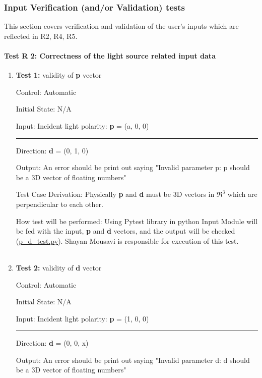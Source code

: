 \documentclass[12pt, titlepage]{article}
\begin{document}
\subsubsection{Input Verification (and/or Validation) tests}


This section covers verification and validation of the user's inputs which are reflected in R2, R4, R5.
		
\paragraph{Test R 2: Correctness of the light source related input data}
\begin{enumerate}		

\item{\textbf{Test 1:} validity of \textbf{p} vector\\}

Control: Automatic
					
Initial State: N/A
					
Input: Incident light polarity: \textbf{p} = (a, 0, 0)\\
\rule{1.15cm}{0pt} Direction: \textbf{d} = (0, 1, 0)
					
Output: An error should be print out saying "Invalid parameter p: p should be a 3D vector of floating numbers"  

Test Case Derivation: Physically \textbf{p} and \textbf{d} must be 3D vectors in $\Re^3$ which are perpendicular to each other.
 				
How test will be performed: Using Pytest library in python Input Module will be fed with the input, \textbf{p} and \textbf{d} vectors, and the output will be checked (\href{https://github.com/shmouses/SPDFM/tree/master/src}{p\_d\_test.py}). Shayan Mousavi is responsible for execution of this test. 
\\
\\
%
\item{\textbf{Test 2:} validity of \textbf{d} vector \\}

Control: Automatic

Initial State: N/A

Input: Incident light polarity: \textbf{p} = (1, 0, 0)\\
\rule{1.15cm}{0pt} Direction: \textbf{d} = (0, 0, x)

Output: An error should be print out saying "Invalid parameter d: d should be a 3D vector of floating numbers"  


\end{enumerate}
\end{document}

